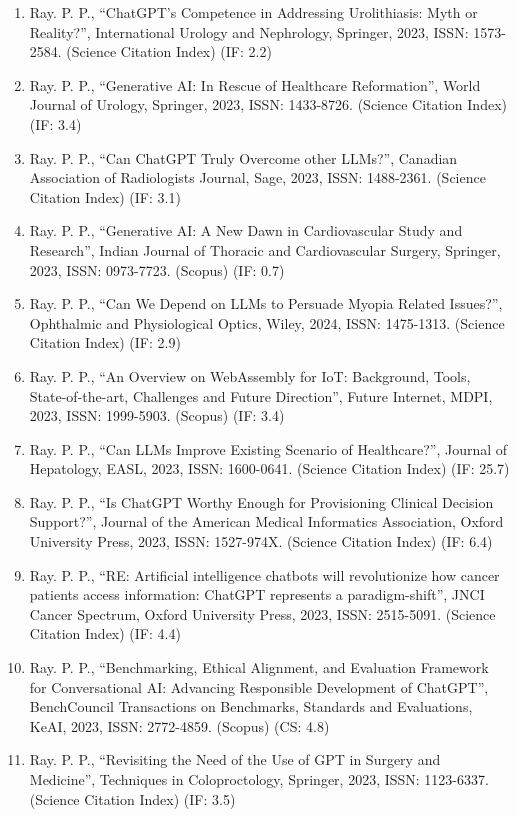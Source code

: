 \documentclass[11pt,a4paper]{moderncv}
\begin{document}
\begin{adjustwidth}{6em}{0pt}
\begin{enumerate}
		
		\item Ray. P. P., “ChatGPT’s Competence in Addressing Urolithiasis: Myth or Reality?”, International Urology and Nephrology, Springer, 2023, ISSN: 1573-2584. (Science Citation Index) (IF: 2.2)
		\item Ray. P. P., “Generative AI: In Rescue of Healthcare Reformation”, World Journal of Urology, Springer, 2023, ISSN: 1433-8726. (Science Citation Index) (IF: 3.4)
		\item Ray. P. P., “Can ChatGPT Truly Overcome other LLMs?”, Canadian Association of Radiologists Journal, Sage, 2023, ISSN: 1488-2361. (Science Citation Index) (IF: 3.1)
		\item Ray. P. P., “Generative AI: A New Dawn in Cardiovascular Study and Research”, Indian Journal of Thoracic and Cardiovascular Surgery, Springer, 2023, ISSN: 0973-7723. (Scopus) (IF: 0.7)
		\item Ray. P. P., “Can We Depend on LLMs to Persuade Myopia Related Issues?”, Ophthalmic and Physiological Optics, Wiley, 2024, ISSN: 1475-1313. (Science Citation Index) (IF: 2.9)
		\item Ray. P. P., “An Overview on WebAssembly for IoT: Background, Tools, State-of-the-art, Challenges and Future Direction”, Future Internet, MDPI, 2023, ISSN: 1999-5903. (Scopus) (IF: 3.4)
		\item Ray. P. P., “Can LLMs Improve Existing Scenario of Healthcare?”, Journal of Hepatology, EASL, 2023, ISSN: 1600-0641. (Science Citation Index) (IF: 25.7)
		\item Ray. P. P., “Is ChatGPT Worthy Enough for Provisioning Clinical Decision Support?”, Journal of the American Medical Informatics Association, Oxford University Press, 2023, ISSN: 1527-974X. (Science Citation Index) (IF: 6.4)
		\item Ray. P. P., “RE: Artificial intelligence chatbots will revolutionize how cancer patients access information: ChatGPT represents a paradigm-shift”, JNCI Cancer Spectrum, Oxford University Press, 2023, ISSN: 2515-5091. (Science Citation Index) (IF: 4.4)
		\item Ray. P. P., “Benchmarking, Ethical Alignment, and Evaluation Framework for Conversational AI: Advancing Responsible Development of ChatGPT”, BenchCouncil Transactions on Benchmarks, Standards and Evaluations, KeAI, 2023, ISSN: 2772-4859. (Scopus) (CS: 4.8)
		\item Ray. P. P., “Revisiting the Need of the Use of GPT in Surgery and Medicine”, Techniques in Coloproctology, Springer, 2023, ISSN: 1123-6337. (Science Citation Index) (IF: 3.5)

\end{enumerate}
\end{adjustwidth}
\end{document}
